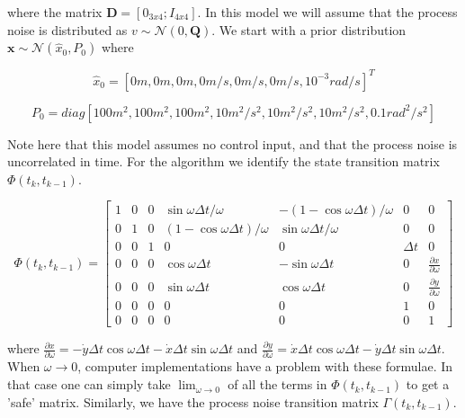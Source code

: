 \documentclass{article}
\begin{document}
where the matrix $\mathbf{D}=[0_{3x4}; I_{4x4}]$. In this model we will assume that the process noise is distributed as $v \sim \mathcal{N}(0, \mathbf{Q})$. We start with a prior distribution $\mathbf{x} \sim \mathcal{N}(\hat{x}_0, P_0)$ where

\begin{equation}\label{eqn:prior_mean}
	\hat{x}_0 = [0 m, 0 m, 0 m, 0 m/s, 0 m/s, 0 m/s, 10^{-3} rad/s]^T
\end{equation}

\begin{equation}\label{eqn:prior_cov}
	P_0 = diag[100 m^2, 100 m^2, 100 m^2, 10 m^2/s^2, 10 m^2/s^2, 10 m^2/s^2, 0.1 rad^2/s^2]
\end{equation}

Note here that this model assumes no control input, and that the process noise is uncorrelated in time. For the algorithm we identify the state transition matrix $\Phi(t_k,t_{k-1})$.


\begin{equation}\label{eqn:stm}
	\Phi(t_k,t_{k-1}) = 
	\begin{bmatrix}
		1 & 0 & 0 & \sin{\omega \Delta t}/\omega & -(1-\cos{\omega \Delta t})/\omega & 0 & 0 \\
		0 & 1 & 0 & (1-\cos{\omega \Delta t})/\omega & \sin{\omega \Delta t}/\omega & 0 & 0 \\
		0 & 0 & 1 & 0 & 0 & \Delta t & 0 \\
		0 & 0 & 0 & \cos{\omega \Delta t} & -\sin{\omega \Delta t} & 0 & \frac{\partial x}{\partial \omega} \\
		0 & 0 & 0 & \sin{\omega \Delta t} & \cos{\omega \Delta t} & 0 & \frac{\partial y}{\partial \omega} \\
		0 & 0 & 0 & 0 & 0 & 1 & 0 \\
		0 & 0 & 0 & 0 & 0 & 0 & 1
	\end{bmatrix}
\end{equation}

where $\frac{\partial x}{\partial \omega} = -\dot{y}\Delta t \cos{\omega \Delta t} - \dot{x}\Delta t \sin{\omega \Delta t}$ and $\frac{\partial y}{\partial \omega} = \dot{x}\Delta t \cos{\omega \Delta t} - \dot{y}\Delta t \sin{\omega \Delta t}$. When $\omega \rightarrow 0$, computer implementations have a problem with these formulae. In that case one can simply take $\lim_{\omega \rightarrow 0}$ of all the terms in $\Phi(t_k,t_{k-1})$ to get a 'safe' matrix. Similarly, we have the process noise transition matrix $\Gamma(t_k,t_{k-1})$.
\end{document}
